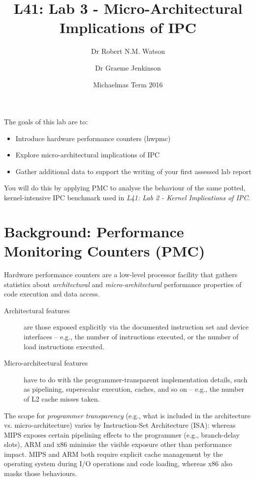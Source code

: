 \documentclass[a4paper,10pt]{article}
\begin{document}
\title{L41: Lab 3 - Micro-Architectural Implications of IPC}
\author{Dr Robert N.M. Watson
	\and
	Dr Graeme Jenkinson}
\date{Michaelmas Term 2016}
\maketitle

\noindent
The goals of this lab are to:

\begin{itemize}
\item Introduce hardware performance counters (hwpmc)
\item Explore micro-architectural implications of IPC
\item Gather additional data to support the writing of your first assessed lab
  report
\end{itemize}

\noindent
You will do this by applying PMC to analyse the behaviour of the same potted,
kernel-intensive IPC benchmark used in \textit{L41: Lab 2 - Kernel
Implications of IPC}.

\section*{Background: Performance Monitoring Counters (PMC)}

Hardware performance counters are a low-level processor facility that gathers
statistics about \textit{architectural} and \textit{micro-architectural}
performance properties of code execution and data access.

\begin{description}
\item[Architectural features] are those exposed explicitly via the documented
instruction set and device interfaces -- e.g., the number of instructions
executed, or the number of load instructions executed.

\item[Micro-architectural features] have to do with the programmer-transparent
implementation details, such as pipelining, superscalar execution, caches, and
so on -- e.g., the number of L2 cache misses taken.
\end{description}

The scope for \textit{programmer transparency} (e.g., what is included in the
architecture vs. micro-architecture) varies by Instruction-Set Architecture
(ISA): whereas MIPS exposes certain pipelining effects to the programmer
(e.g., branch-delay slots), ARM and x86 minimise the visible exposure other
than performance impact.
MIPS and ARM both require explicit cache management by the operating system
during I/O operations and code loading, whereas x86 also masks those
behaviours.
\end{document}
